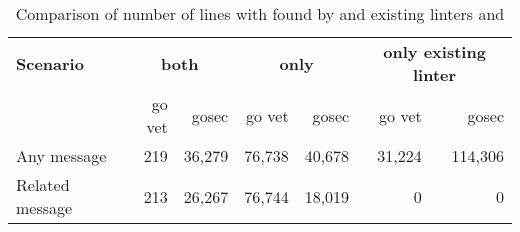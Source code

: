\begin{table}[htp!]
    \centering
    \caption{Comparison of number of lines with \unsafe{} found by \toolGeiger{} and existing linters \toolVet{} and \toolGosec{}}
    \label{tbl:go-geiger-evaluation-linters}
    \begin{tabular}{l|rr|rr|rr}
        \textbf{Scenario} & \multicolumn{2}{c|}{\textbf{both}} & \multicolumn{2}{c|}{\textbf{only \toolGeiger{}}} & \multicolumn{2}{c}{\textbf{only existing linter}} \\
        {}                & go vet          & gosec            & go vet          & gosec                          & go vet          & gosec                           \\
        \hline
        Any message       & 219             & 36,279           & 76,738          & 40,678                         &  31,224         & 114,306                         \\
        Related message   & 213             & 26,267           & 76,744          & 18,019                         &       0         & 0                               \\
    \end{tabular}
\end{table}